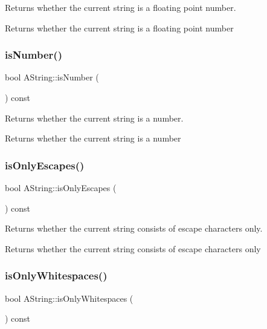 Returns whether the current string is a floating point number. 

\begin{DoxyReturn}{Returns}
whether the current string is a floating point number 
\end{DoxyReturn}
\mbox{\label{class_a_string_a8b3516a3c934fde801074ef792f1468b}} 
\subsubsection{\texorpdfstring{isNumber()}{isNumber()}}
{\footnotesize\ttfamily bool A\+String\+::is\+Number (\begin{DoxyParamCaption}{ }\end{DoxyParamCaption}) const}



Returns whether the current string is a number. 

\begin{DoxyReturn}{Returns}
whether the current string is a number 
\end{DoxyReturn}
\mbox{\label{class_a_string_a7d7f2482f18578ddda0ec825ef58545a}} 
\subsubsection{\texorpdfstring{isOnlyEscapes()}{isOnlyEscapes()}}
{\footnotesize\ttfamily bool A\+String\+::is\+Only\+Escapes (\begin{DoxyParamCaption}{ }\end{DoxyParamCaption}) const}



Returns whether the current string consists of escape characters only. 

\begin{DoxyReturn}{Returns}
whether the current string consists of escape characters only 
\end{DoxyReturn}
\mbox{\label{class_a_string_a506192a29a529eccacfa3a4dfb1a234b}} 
\subsubsection{\texorpdfstring{isOnlyWhitespaces()}{isOnlyWhitespaces()}}
{\footnotesize\ttfamily bool A\+String\+::is\+Only\+Whitespaces (\begin{DoxyParamCaption}{ }\end{DoxyParamCaption}) const}



